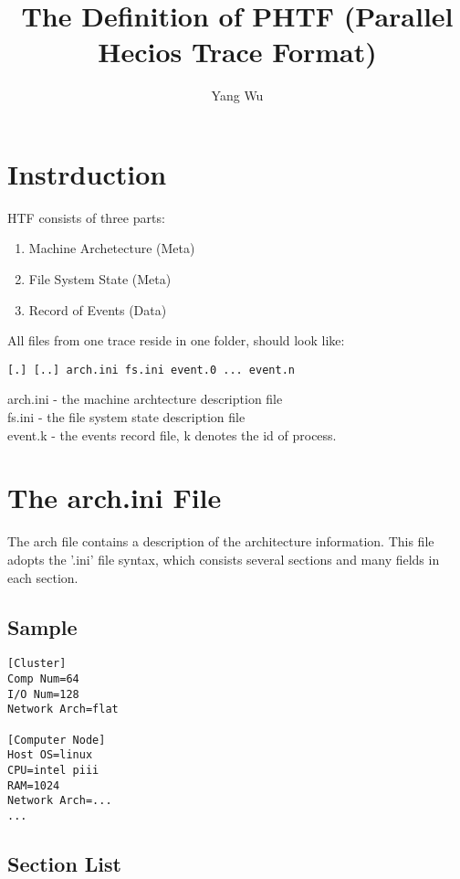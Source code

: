 \documentclass[9pt]{article}
\title{The Definition of PHTF (Parallel Hecios Trace Format)}
\author{Yang Wu}
\begin{document}
\maketitle

\section{Instrduction}
\label{sec:Instrduction}

HTF consists of three parts:
\begin{enumerate}
	\item Machine Archetecture (Meta)
	\item File System State (Meta)
	\item Record of Events (Data)
\end{enumerate}

All files from one trace reside in one folder, should look like:
\begin{verbatim}
[.] [..] arch.ini fs.ini event.0 ... event.n
\end{verbatim}

\begin{description}
	\item[arch.ini - the machine archtecture description file] 
	\item[fs.ini - the file system state description file]
	\item[event.k - the events record file, k denotes the id of process.]
\end{description}

\section{The arch.ini File}
\label{sec:TheArchIniFile}

The arch file contains a description of the architecture information. This file adopts the '.ini' file syntax, which consists several sections and many fields in each section.

\subsection{Sample}
\label{sec:SampleArch}
\begin{verbatim}
[Cluster]
Comp Num=64
I/O Num=128
Network Arch=flat

[Computer Node]
Host OS=linux
CPU=intel piii
RAM=1024
Network Arch=...
...
\end{verbatim}

\subsection{Section List}
\label{sec:SectionList}
\end{document}
